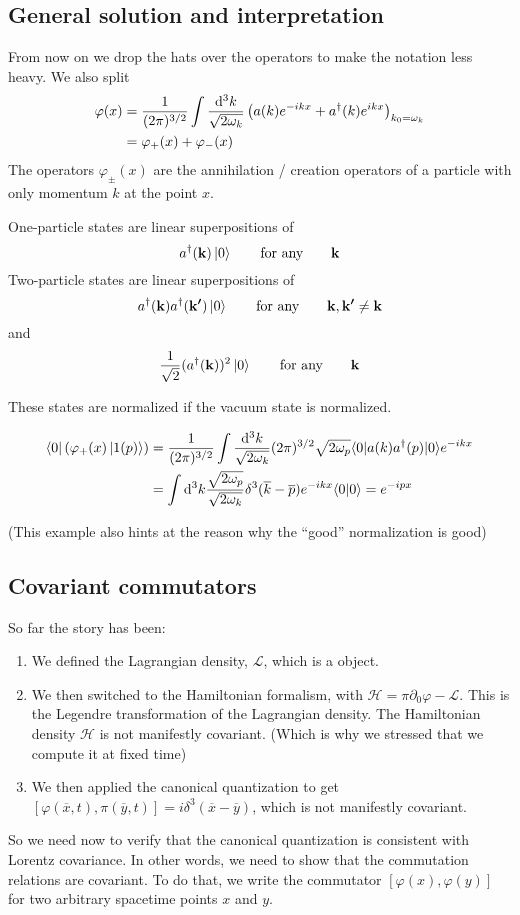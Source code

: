 \subsection{General solution and interpretation}


From now on we drop the hats over the operators to make the notation less heavy. We also split 
\begin{align*}
\varphi(x) &= \frac{1}{(2\pi)^{3/2}} \int \frac{\operatorname{d \!}{^{3}k}}{\sqrt{2\omega_k}}\left(a(k)e^{-ikx} + a^\dagger(k)e^{ikx}\right)_{k_0 = \omega_k} \\
&= \varphi_+(x) + \varphi_-(x)
\end{align*}
The operators $\varphi_\pm(x)$ are the annihilation / creation operators of a particle with only momentum $k$ at the point $x$.

One-particle states are linear superpositions of
\[ a^\dagger(\boldsymbol{\mathrm{k}})\left| 0 \right\rangle \qquad\text{for any}\qquad \boldsymbol{\mathrm{k}} \]
Two-particle states are linear superpositions of
\[ a^\dagger(\boldsymbol{\mathrm{k}})a^\dagger(\boldsymbol{\mathrm{k'}})\left| 0 \right\rangle \qquad\text{for any}\qquad  \boldsymbol{\mathrm{k}}, \boldsymbol{\mathrm{k'}} \neq \boldsymbol{\mathrm{k}} \]
and
\[ \frac{1}{\sqrt{2}}(a^\dagger(\boldsymbol{\mathrm{k}}))^2\left| 0 \right\rangle \qquad\text{for any}\qquad  \boldsymbol{\mathrm{k}} \]

These states are normalized if the vacuum state is normalized.
\begin{example}
\begin{align*}
\bra{0}\left(\varphi_+(x)\ket{1(p)}\right) &= \frac{1}{(2\pi)^{3/2}} \int \frac{\diff{^{3}k}}{\sqrt{2\omega_k}}(2\pi)^{3/2}\sqrt{2\omega_p}\braket[a(k)a^\dagger(p)]{0}{0}e^{-ikx} \\
&= \int \diff{^3k}\frac{\sqrt{2\omega_p}}{\sqrt{2\omega_k}}\delta^3(\overline{k} - \overline{p})e^{-ikx}\braket{0}{0} = e^{-ipx}
\end{align*}
\end{example}
(This example also hints at the reason why the ``good'' normalization is good)


\subsection{Covariant commutators}
So far the story has been:
\begin{enumerate}
\item We defined the Lagrangian density, $\mathcal{L}$, which is a  object.
\item We then switched to the Hamiltonian formalism, with $\mathcal{H} = \pi\partial_0\varphi - \mathcal{L}$. This is the Legendre transformation of the Lagrangian density. The Hamiltonian density $\mathcal{H}$ is not manifestly covariant. (Which is why we stressed that we compute it at fixed time)
\item We then applied the canonical quantization to get $[\varphi(\overline{x},t), \pi(\overline{y},t)] = i\delta^3(\overline{x}- \overline{y})$, which is not manifestly covariant.
\end{enumerate}
So we need now to verify that the canonical quantization is consistent with Lorentz covariance.
In other words, we need to show that the commutation relations are covariant. 
To do that, we write the commutator $[\varphi(x), \varphi(y)]$ for two arbitrary spacetime points $x$ and $y$.

